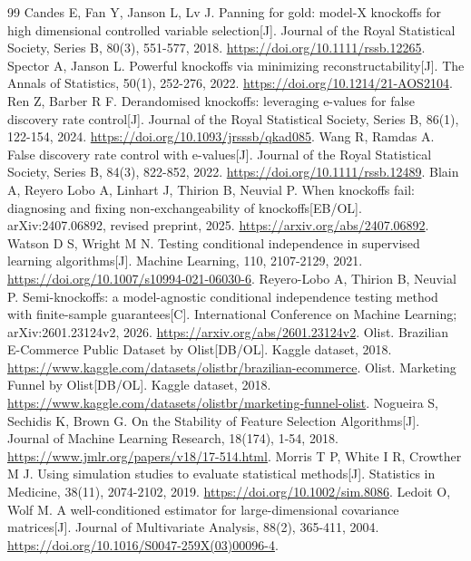 \documentclass[UTF8,11pt,a4paper]{ctexart}
\begin{document}
\begin{thebibliography}{99}
 Candes E, Fan Y, Janson L, Lv J. Panning for gold: model-X knockoffs for high dimensional controlled variable selection[J]. Journal of the Royal Statistical Society, Series B, 80(3), 551-577, 2018. \url{https://doi.org/10.1111/rssb.12265}.
 Spector A, Janson L. Powerful knockoffs via minimizing reconstructability[J]. The Annals of Statistics, 50(1), 252-276, 2022. \url{https://doi.org/10.1214/21-AOS2104}.
 Ren Z, Barber R F. Derandomised knockoffs: leveraging e-values for false discovery rate control[J]. Journal of the Royal Statistical Society, Series B, 86(1), 122-154, 2024. \url{https://doi.org/10.1093/jrsssb/qkad085}.
 Wang R, Ramdas A. False discovery rate control with e-values[J]. Journal of the Royal Statistical Society, Series B, 84(3), 822-852, 2022. \url{https://doi.org/10.1111/rssb.12489}.
 Blain A, Reyero Lobo A, Linhart J, Thirion B, Neuvial P. When knockoffs fail: diagnosing and fixing non-exchangeability of knockoffs[EB/OL]. arXiv:2407.06892, revised preprint, 2025. \url{https://arxiv.org/abs/2407.06892}.
 Watson D S, Wright M N. Testing conditional independence in supervised learning algorithms[J]. Machine Learning, 110, 2107-2129, 2021. \url{https://doi.org/10.1007/s10994-021-06030-6}.
 Reyero-Lobo A, Thirion B, Neuvial P. Semi-knockoffs: a model-agnostic conditional independence testing method with finite-sample guarantees[C]. International Conference on Machine Learning; arXiv:2601.23124v2, 2026. \url{https://arxiv.org/abs/2601.23124v2}.
 Olist. Brazilian E-Commerce Public Dataset by Olist[DB/OL]. Kaggle dataset, 2018. \url{https://www.kaggle.com/datasets/olistbr/brazilian-ecommerce}.
 Olist. Marketing Funnel by Olist[DB/OL]. Kaggle dataset, 2018. \url{https://www.kaggle.com/datasets/olistbr/marketing-funnel-olist}.
 Nogueira S, Sechidis K, Brown G. On the Stability of Feature Selection Algorithms[J]. Journal of Machine Learning Research, 18(174), 1-54, 2018. \url{https://www.jmlr.org/papers/v18/17-514.html}.
 Morris T P, White I R, Crowther M J. Using simulation studies to evaluate statistical methods[J]. Statistics in Medicine, 38(11), 2074-2102, 2019. \url{https://doi.org/10.1002/sim.8086}.
 Ledoit O, Wolf M. A well-conditioned estimator for large-dimensional covariance matrices[J]. Journal of Multivariate Analysis, 88(2), 365-411, 2004. \url{https://doi.org/10.1016/S0047-259X(03)00096-4}.
\end{thebibliography}
\end{document}
